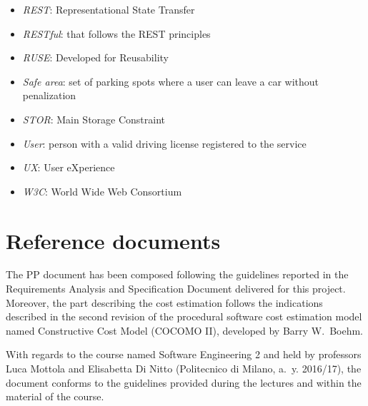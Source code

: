\begin{itemize}
	\item \emph{REST}: Representational State Transfer
	\item \emph{RESTful}: that follows the REST principles
	\item \emph{RUSE}: Developed for Reusability
	\item \emph{Safe area}: set of parking spots where a user can leave a car without penalization 
	\item \emph{STOR}: Main Storage Constraint
	\item \emph{User}: person with a valid driving license registered to the service
	\item \emph{UX}: User eXperience
	\item \emph{W3C}: World Wide Web Consortium
\end{itemize}

\section{Reference documents}
The PP document has been composed following the guidelines reported in the Requirements Analysis and Specification Document delivered for this project. Moreover, the part describing the cost estimation follows the indications described in the second revision of the procedural software cost estimation model named Constructive Cost Model (COCOMO II), developed by Barry W.~Boehm.

With regards to the course named Software Engineering 2 and held by professors Luca Mottola and Elisabetta Di Nitto (Politecnico di Milano, a.~y. 2016/17), the document conforms to the guidelines provided during the lectures and within the material of the course.